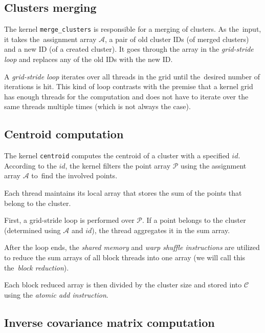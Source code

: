\subsection{Clusters merging}


The kernel \texttt{merge\_clusters} is responsible for a merging of clusters. As the~input, it takes the~assignment array $\mathcal{A}$, a pair of old cluster IDs (of merged clusters) and a new ID (of a created cluster). It goes through the array in the \emph{grid-stride loop} and replaces any of the old IDs with the new ID.

\begin{defn}
	A \emph{grid-stride loop} iterates over all threads in the grid until the~desired number of iterations is hit. This kind of loop contrasts with the premise that a kernel grid has enough threads for the computation and does not have to iterate over the same threads multiple times (which is not always the case). 
	\label{def03:grid-stride}
\end{defn}

\subsection{Centroid computation}

The kernel \texttt{centroid} computes the centroid of a cluster with a specified $id$. According to the $id$, the kernel filters the point array $\mathcal{P}$ using the assignment array $\mathcal{A}$ to~find the involved points.

Each thread maintains its local array that stores the sum of the points that belong to the cluster. 

First, a grid-stride loop is performed over $\mathcal{P}$. If a point belongs to the cluster (determined using $\mathcal{A}$ and $id$), the thread aggregates it in the sum array. 

After the loop ends, the \emph{shared memory} and \emph{warp shuffle instructions} are utilized to reduce the sum arrays of all block threads into one array (we will call this the~\emph{block reduction}).

Each block reduced array is then divided by the cluster size and stored into $\mathcal{C}$ using the \emph{atomic add instruction}. 

\subsection{Inverse covariance matrix computation}


